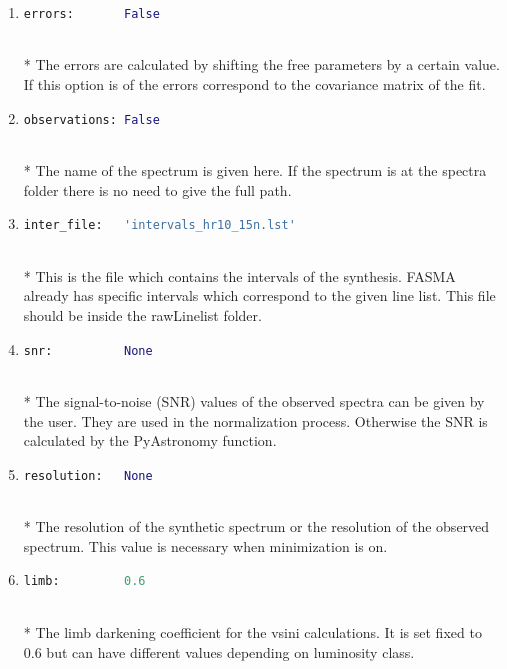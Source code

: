 \documentclass[a4paper,10pt]{article}
\begin{document}
\begin{enumerate}
\item
\begin{lstlisting}[language=Python]
errors:       False 
\end{lstlisting} 
\\*
The errors are calculated by shifting the free parameters by a certain value. If this option is of the errors correspond to the covariance matrix of the fit.

\item
\begin{lstlisting}[language=Python]
observations: False 
\end{lstlisting} 
\\*
The name of the spectrum is given here. If the spectrum is at the spectra folder there is no need to give the full path. 

\item
\begin{lstlisting}[language=Python]
inter_file:   'intervals_hr10_15n.lst' 
\end{lstlisting} 
\\*
This is the file which contains the intervals of the synthesis. FASMA already has specific intervals which correspond to the given line list. This file should be inside the rawLinelist folder.

\item
\begin{lstlisting}[language=Python]
snr:          None
\end{lstlisting} 
\\*
The signal-to-noise (SNR) values of the observed spectra can be given by the user. They are used in the normalization process. Otherwise the SNR is calculated by the PyAstronomy function.

\item
\begin{lstlisting}[language=Python]
resolution:   None
\end{lstlisting} 
\\*
The resolution of the synthetic spectrum or the resolution of the observed spectrum. This value is necessary when minimization is on.

\item
\begin{lstlisting}[language=Python]
limb:         0.6 
\end{lstlisting} 
\\*
The limb darkening coefficient for the vsini calculations. It is set fixed to 0.6 but can have different values depending on luminosity class.
\end{enumerate}
\end{document}
